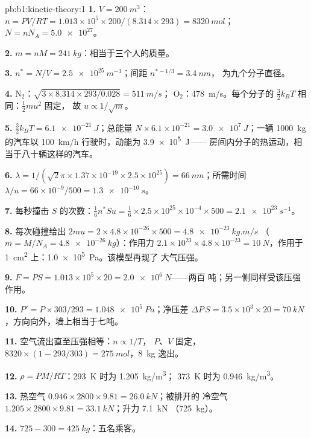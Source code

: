 \begin{solution}{pb:b1:kinetic-theory:1}
\textbf{1.} $V = \qty{200}{m^3}$：$n = PV/RT = 1.013\times10^5 \times 200/(8.314
\times 293) = \qty{8320}{mol}$；$N = nN_A = \num{5.0e27}$。

\textbf{2.} $m = nM = \qty{241}{kg}$：相当于三个人的质量。

\textbf{3.} $n^* = N/V = \qty{2.5e25}{m^{-3}}$；间距 $n^{*-1/3} = \qty{3.4}{nm}$，
为九个分子直径。

\textbf{4.} N$_2$：$\sqrt{3 \times 8.314 \times 293/0.028} = \qty{511}{m/s}$；
O$_2$：\qty{478}{m/s}。每个分子的 $\tfrac32 k_BT$ 相同：$\tfrac12 mu^2$ 固定，
故 $u \propto 1/\sqrt m$。

\textbf{5.} $\tfrac32 k_BT = \qty{6.1e-21}{J}$；总能量 $N \times 6.1\times10^{-21}
= \qty{3.0e7}{J}$；一辆 \qty{1000}{kg} 的汽车以 \qty{100}{km/h} 行驶时，动能为 \qty{3.9e5}{J}——
房间内分子的热运动，相当于八十辆这样的汽车。

\textbf{6.} $\lambda = 1/(\sqrt2\pi \times 1.37\times10^{-19} \times 2.5\times10^{25})
= \qty{66}{nm}$；所需时间 $\lambda/u = 66\times10^{-9}/500 = \qty{1.3e-10}{s}$。

\textbf{7.} 每秒撞击 $S$ 的次数：$\tfrac16 n^*Su = \tfrac16 \times 2.5\times
10^{25} \times 10^{-4} \times 500 = \qty{2.1e23}{s^{-1}}$。

\textbf{8.} 每次碰撞给出 $2mu = 2 \times 4.8\times10^{-26} \times 500 = \qty{4.8e-23}{kg.m/s}$
（$m = M/N_A = \qty{4.8e-26}{kg}$）：作用力 $2.1\times10^{23} \times 4.8\times10^{-23}
= \qty{10}{N}$，作用于 \qty{1}{cm^2} 上：\qty{1.0e5}{Pa}。该模型再现了
大气压强。

\textbf{9.} $F = PS = 1.013\times10^5 \times 20 = \qty{2.0e6}{N}$——两百
吨；另一侧同样受该压强作用。

\textbf{10.} $P' = P \times 303/293 = \qty{1.048e5}{Pa}$；净压差 $\Delta P\,S = 3.5
\times10^3 \times 20 = \qty{70}{kN}$，方向向外，墙上相当于七吨。

\textbf{11.} 空气流出直至压强相等：$n \propto 1/T$，
$P$、$V$ 固定，$8320 \times (1 - 293/303) = \qty{275}{mol}$，\qty{8}{kg}
逸出。

\textbf{12.} $\rho = PM/RT$：\qty{293}{K} 时为 \qty{1.205}{kg/m^3}；
\qty{373}{K} 时为 \qty{0.946}{kg/m^3}。

\textbf{13.} 热空气 $0.946 \times 2800 \times 9.81 = \qty{26.0}{kN}$；被排开的
冷空气 $1.205 \times 2800 \times 9.81 = \qty{33.1}{kN}$；升力 \qty{7.1}{kN}
（\qty{725}{kg}）。

\textbf{14.} $725 - 300 = \qty{425}{kg}$：五名乘客。


\end{solution}
